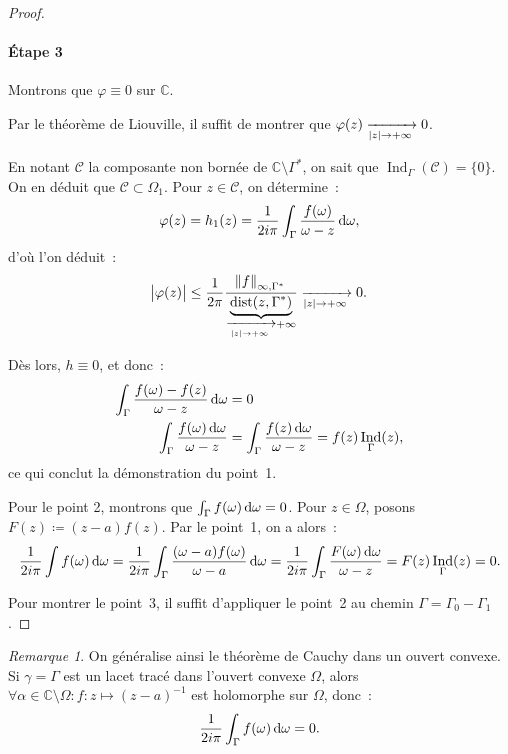 \documentclass{report}
\theoremstyle{definition}
\theoremstyle{remark}
\newtheorem*{rmq}{Remarque}
\numberwithin{equation}{section}
\newcommand{\C}{\mathbb C}
\DeclareMathOperator{\Ind}{Ind}
\DeclareMathOperator{\dist}{dist}
\newcommand{\pinfty}{{+\infty}}
\begin{document}
\begin{proof}
			\paragraph*{Étape 3} Montrons que $\varphi \equiv 0$ sur $\C$.

			Par le théorème de Liouville, il suffit de montrer que $\varphi(z) \xrightarrow[\abs z \to \pinfty]{} 0$.

			En notant $\mathcal C$ la composante non bornée de $\C \setminus \Gamma^*$, on sait que $\Ind_\Gamma(\mathcal C) = \{0\}$. On en déduit que
			$\mathcal C \subset \Omega_1$. Pour $z \in \mathcal C$, on détermine~:
			\begin{equation}
				\varphi(z) = h_1(z) = \frac 1{2i\pi}\int_\Gamma \frac {f(\omega)}{\omega-z}\dif \omega,
			\end{equation}
			d'où l'on déduit~:
			\begin{equation}
				\abs {\varphi(z)} \leq \frac 1{2\pi}\frac {\norm {f}_{\infty, \Gamma^*}}{\underbrace {\dist(z, \Gamma^*)}_{\xrightarrow[\abs z \to \pinfty]{} \pinfty}} \xrightarrow[\abs z \to \pinfty]{} 0.
			\end{equation}

			Dès lors, $h \equiv 0$, et donc~:
			\begin{align}
				\int_\Gamma\frac {f(\omega)-f(z)}{\omega-z}\dif \omega &= 0 \\
				\int_\Gamma\frac {f(\omega)\dif \omega}{\omega-z} &= \int_\Gamma\frac {f(z)\dif \omega}{\omega-z} = f(z)\Ind_\Gamma(z),
			\end{align}
			ce qui conclut la démonstration du point~1.

			Pour le point 2, montrons que $\int_\Gamma f(\omega)\dif \omega = 0$. Pour $z \in \Omega$, posons $F(z) \coloneqq (z-a)f(z)$. Par le point~1, on a alors~:
			\begin{equation}
				\frac 1{2i\pi}\int f(\omega)\dif \omega = \frac 1{2i\pi}\int_\Gamma\frac {(\omega-a)f(\omega)}{\omega-a}\dif \omega
					= \frac 1{2i\pi}\int_\Gamma\frac {F(\omega)\dif \omega}{\omega-z} = F(z)\Ind_\Gamma(z) = 0.
			\end{equation}

			Pour montrer le point~3, il suffit d'appliquer le point~2 au chemin $\Gamma = \Gamma_0 - \Gamma_1$.
			\end{proof}

			\begin{rmq} On généralise ainsi le théorème de Cauchy dans un ouvert convexe. Si $\gamma = \Gamma$ est un lacet tracé dans l'ouvert convexe $\Omega$,
			alors $\forall \alpha \in \C \setminus \Omega : f : z \mapsto (z-a)^{-1}$ est holomorphe sur $\Omega$, donc~:
			\begin{equation}
				\frac 1{2i\pi}\int_\Gamma f(\omega)\dif \omega = 0.
			\end{equation}
			\end{rmq}
\end{document}

